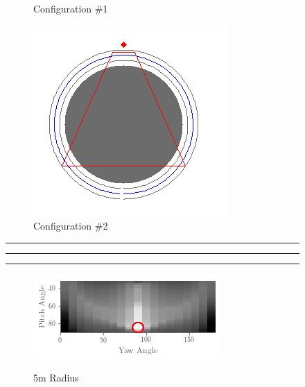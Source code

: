 \documentclass[a4paper,12pt,twoside,openright]{report}
\begin{document}
\begin{figure}[h!]
\begin{subfigure}[b]{0.28\textwidth}
    \caption{Configuration \#1}
\end{subfigure}
\begin{subfigure}[b]{0.28\textwidth}
    \centering
    \includegraphics[width=\textwidth]{figures/simple_objective/radius_20m_pos2_small.png}
    \caption{Configuration \#2}
\end{subfigure}
\hrule
\hrule
\hrule
\begin{subfigure}[b]{0.45\textwidth}
    \centering
    \includegraphics[width=\textwidth]{figures/simple_objective/pitch_yaw_at_radius_5_annotated.png}
    \label{fig:simpleobjective:20radius}
    \caption{5m Radius}
\end{subfigure}
\begin{subfigure}[b]{0.25\textwidth}
    \centering

\end{subfigure}
\end{figure}
\end{document}
